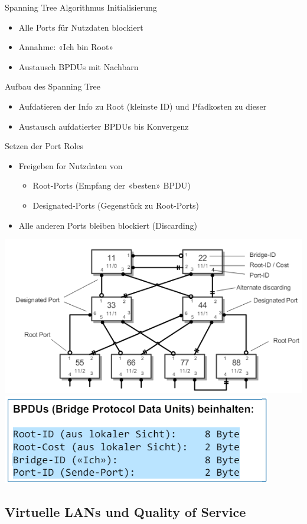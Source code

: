 \begin{KR}{Spanning Tree Algorithmus}
    Initialisierung
    \begin{itemize}
        \item Alle Ports für Nutzdaten blockiert
        \item Annahme: «Ich bin Root»
        \item Austausch BPDUs mit Nachbarn
    \end{itemize}
    Aufbau des Spanning Tree
    \begin{itemize}
        \item Aufdatieren der Info zu Root (kleinste ID) und Pfadkosten zu dieser
        \item Austausch aufdatierter BPDUs bis Konvergenz
    \end{itemize}
    Setzen der Port Roles
    \begin{itemize}
        \item Freigeben for Nutzdaten von
        \begin{itemize}
            \item Root-Ports (Empfang der «besten» BPDU)
            \item Designated-Ports (Gegenstück zu Root-Ports)
        \end{itemize}
        \item Alle anderen Ports bleiben blockiert (Discarding)
    \end{itemize}
        \includegraphics[width=0.75\linewidth]{images/spanning_tree_algorithmus.png}\\
        \includegraphics[width=0.5\linewidth]{images/bdpus.png}
\end{KR}

\subsection{Virtuelle LANs und Quality of Service}

